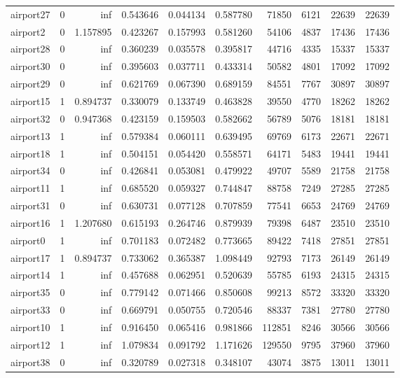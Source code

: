 \documentclass[../../../thesis.tex]{subfiles}
\begin{document}
\begin{longtable}{|l|r|r|r|r|r|r|r|r|r|}
airport27 & 0 & inf & 0.543646 & 0.044134 & 0.587780 & 71850 & 6121 & 22639 & 22639 \\
airport2 & 0 & 1.157895 & 0.423267 & 0.157993 & 0.581260 & 54106 & 4837 & 17436 & 17436 \\
airport28 & 0 & inf & 0.360239 & 0.035578 & 0.395817 & 44716 & 4335 & 15337 & 15337 \\
airport30 & 0 & inf & 0.395603 & 0.037711 & 0.433314 & 50582 & 4801 & 17092 & 17092 \\
airport29 & 0 & inf & 0.621769 & 0.067390 & 0.689159 & 84551 & 7767 & 30897 & 30897 \\
airport15 & 1 & 0.894737 & 0.330079 & 0.133749 & 0.463828 & 39550 & 4770 & 18262 & 18262 \\
airport32 & 0 & 0.947368 & 0.423159 & 0.159503 & 0.582662 & 56789 & 5076 & 18181 & 18181 \\
airport13 & 1 & inf & 0.579384 & 0.060111 & 0.639495 & 69769 & 6173 & 22671 & 22671 \\
airport18 & 1 & inf & 0.504151 & 0.054420 & 0.558571 & 64171 & 5483 & 19441 & 19441 \\
airport34 & 0 & inf & 0.426841 & 0.053081 & 0.479922 & 49707 & 5589 & 21758 & 21758 \\
airport11 & 1 & inf & 0.685520 & 0.059327 & 0.744847 & 88758 & 7249 & 27285 & 27285 \\
airport31 & 0 & inf & 0.630731 & 0.077128 & 0.707859 & 77541 & 6653 & 24769 & 24769 \\
airport16 & 1 & 1.207680 & 0.615193 & 0.264746 & 0.879939 & 79398 & 6487 & 23510 & 23510 \\
airport0 & 1 & inf & 0.701183 & 0.072482 & 0.773665 & 89422 & 7418 & 27851 & 27851 \\
airport17 & 1 & 0.894737 & 0.733062 & 0.365387 & 1.098449 & 92793 & 7173 & 26149 & 26149 \\
airport14 & 1 & inf & 0.457688 & 0.062951 & 0.520639 & 55785 & 6193 & 24315 & 24315 \\
airport35 & 0 & inf & 0.779142 & 0.071466 & 0.850608 & 99213 & 8572 & 33320 & 33320 \\
airport33 & 0 & inf & 0.669791 & 0.050755 & 0.720546 & 88337 & 7381 & 27780 & 27780 \\
airport10 & 1 & inf & 0.916450 & 0.065416 & 0.981866 & 112851 & 8246 & 30566 & 30566 \\
airport12 & 1 & inf & 1.079834 & 0.091792 & 1.171626 & 129550 & 9795 & 37960 & 37960 \\
airport38 & 0 & inf & 0.320789 & 0.027318 & 0.348107 & 43074 & 3875 & 13011 & 13011 \\

\end{longtable}
\end{document}
